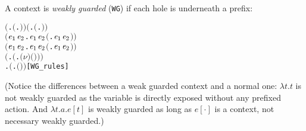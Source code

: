 A context is \emph{weakly guarded} (\texttt{WG}) if each hole is
underneath a prefix:
\begin{alltt}
\HOLTokenTurnstile{} \ensuremath{(}\HOLSymConst{\HOLTokenForall{}}.  \ensuremath{(}\HOLTokenLambda{}. \ensuremath{)}\ensuremath{)} \HOLSymConst{\HOLTokenConj{}} \ensuremath{(}\HOLSymConst{\HOLTokenForall{}} .   \HOLSymConst{\HOLTokenImp{}}  \ensuremath{(}\HOLTokenLambda{}. \HOLSymConst{\ensuremath{\ldotp}} \ensuremath{)}\ensuremath{)} \HOLSymConst{\HOLTokenConj{}}
   \ensuremath{(}\HOLSymConst{\HOLTokenForall{}}\ensuremath{\HOLBoundVar{e}\sb{\mathrm{1}}} \ensuremath{\HOLBoundVar{e}\sb{\mathrm{2}}}.  \ensuremath{\HOLBoundVar{e}\sb{\mathrm{1}}} \HOLSymConst{\HOLTokenConj{}}  \ensuremath{\HOLBoundVar{e}\sb{\mathrm{2}}} \HOLSymConst{\HOLTokenImp{}}  \ensuremath{(}\HOLTokenLambda{}. \ensuremath{\HOLBoundVar{e}\sb{\mathrm{1}}}  \HOLSymConst{\ensuremath{+}} \ensuremath{\HOLBoundVar{e}\sb{\mathrm{2}}} \ensuremath{)}\ensuremath{)} \HOLSymConst{\HOLTokenConj{}}
   \ensuremath{(}\HOLSymConst{\HOLTokenForall{}}\ensuremath{\HOLBoundVar{e}\sb{\mathrm{1}}} \ensuremath{\HOLBoundVar{e}\sb{\mathrm{2}}}.  \ensuremath{\HOLBoundVar{e}\sb{\mathrm{1}}} \HOLSymConst{\HOLTokenConj{}}  \ensuremath{\HOLBoundVar{e}\sb{\mathrm{2}}} \HOLSymConst{\HOLTokenImp{}}  \ensuremath{(}\HOLTokenLambda{}. \ensuremath{\HOLBoundVar{e}\sb{\mathrm{1}}}  \HOLSymConst{\ensuremath{\mid}} \ensuremath{\HOLBoundVar{e}\sb{\mathrm{2}}} \ensuremath{)}\ensuremath{)} \HOLSymConst{\HOLTokenConj{}}
   \ensuremath{(}\HOLSymConst{\HOLTokenForall{}} .   \HOLSymConst{\HOLTokenImp{}}  \ensuremath{(}\HOLTokenLambda{}. \ensuremath{(\nu}\ensuremath{)} \ensuremath{(} \ensuremath{)}\ensuremath{)}\ensuremath{)} \HOLSymConst{\HOLTokenConj{}}
   \HOLSymConst{\HOLTokenForall{}} .   \HOLSymConst{\HOLTokenImp{}}  \ensuremath{(}\HOLTokenLambda{}.  \ensuremath{(} \ensuremath{)} \ensuremath{)}\hfill{[WG_rules]}
\end{alltt}
(Notice the differences between a weak guarded context and a normal
one: $\lambda t. t$ is not weakly guarded as the variable is directly
exposed without any prefixed action. And $\lambda t. a.e[t]$ is weakly
guarded as long as $e[\cdot]$ is a context, not necessary weakly guarded.)

